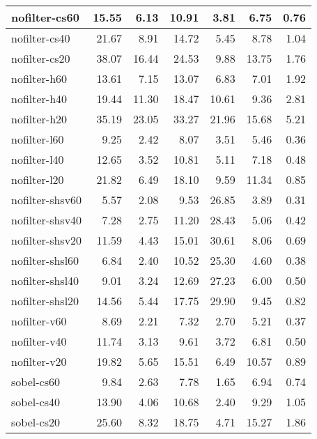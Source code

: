 \begin{tabular}{lrrrrrr}
\toprule
nofilter-cs60       &   15.55 &    6.13 &   10.91 &    3.81 &    6.75 &    0.76 \\
\midrule
nofilter-cs40       &   21.67 &    8.91 &   14.72 &    5.45 &    8.78 &    1.04 \\
nofilter-cs20       &   38.07 &   16.44 &   24.53 &    9.88 &   13.75 &    1.76 \\
nofilter-h60        &   13.61 &    7.15 &   13.07 &    6.83 &    7.01 &    1.92 \\
nofilter-h40        &   19.44 &   11.30 &   18.47 &   10.61 &    9.36 &    2.81 \\
nofilter-h20        &   35.19 &   23.05 &   33.27 &   21.96 &   15.68 &    5.21 \\
nofilter-l60        &    9.25 &    2.42 &    8.07 &    3.51 &    5.46 &    0.36 \\
nofilter-l40        &   12.65 &    3.52 &   10.81 &    5.11 &    7.18 &    0.48 \\
nofilter-l20        &   21.82 &    6.49 &   18.10 &    9.59 &   11.34 &    0.85 \\
nofilter-shsv60     &    5.57 &    2.08 &    9.53 &   26.85 &    3.89 &    0.31 \\
nofilter-shsv40     &    7.28 &    2.75 &   11.20 &   28.43 &    5.06 &    0.42 \\
nofilter-shsv20     &   11.59 &    4.43 &   15.01 &   30.61 &    8.06 &    0.69 \\
nofilter-shsl60     &    6.84 &    2.40 &   10.52 &   25.30 &    4.60 &    0.38 \\
nofilter-shsl40     &    9.01 &    3.24 &   12.69 &   27.23 &    6.00 &    0.50 \\
nofilter-shsl20     &   14.56 &    5.44 &   17.75 &   29.90 &    9.45 &    0.82 \\
nofilter-v60        &    8.69 &    2.21 &    7.32 &    2.70 &    5.21 &    0.37 \\
nofilter-v40        &   11.74 &    3.13 &    9.61 &    3.72 &    6.81 &    0.50 \\
nofilter-v20        &   19.82 &    5.65 &   15.51 &    6.49 &   10.57 &    0.89 \\
sobel-cs60          &    9.84 &    2.63 &    7.78 &    1.65 &    6.94 &    0.74 \\
sobel-cs40          &   13.90 &    4.06 &   10.68 &    2.40 &    9.29 &    1.05 \\
sobel-cs20          &   25.60 &    8.32 &   18.75 &    4.71 &   15.27 &    1.86 \\

\end{tabular}
